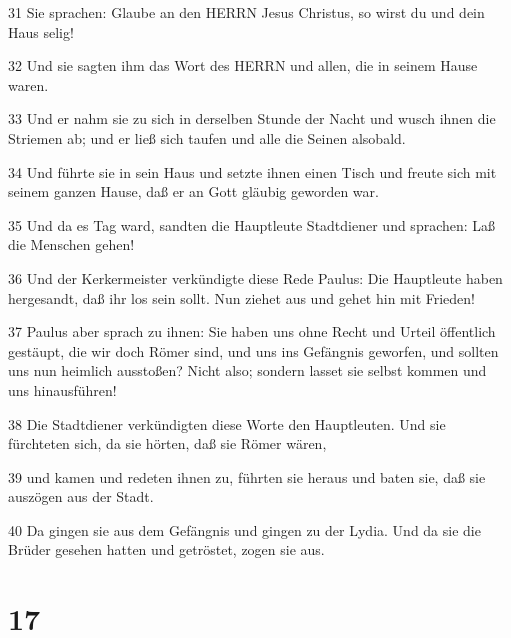 \par 31 Sie sprachen: Glaube an den HERRN Jesus Christus, so wirst du und dein Haus selig!
\par 32 Und sie sagten ihm das Wort des HERRN und allen, die in seinem Hause waren.
\par 33 Und er nahm sie zu sich in derselben Stunde der Nacht und wusch ihnen die Striemen ab; und er ließ sich taufen und alle die Seinen alsobald.
\par 34 Und führte sie in sein Haus und setzte ihnen einen Tisch und freute sich mit seinem ganzen Hause, daß er an Gott gläubig geworden war.
\par 35 Und da es Tag ward, sandten die Hauptleute Stadtdiener und sprachen: Laß die Menschen gehen!
\par 36 Und der Kerkermeister verkündigte diese Rede Paulus: Die Hauptleute haben hergesandt, daß ihr los sein sollt. Nun ziehet aus und gehet hin mit Frieden!
\par 37 Paulus aber sprach zu ihnen: Sie haben uns ohne Recht und Urteil öffentlich gestäupt, die wir doch Römer sind, und uns ins Gefängnis geworfen, und sollten uns nun heimlich ausstoßen? Nicht also; sondern lasset sie selbst kommen und uns hinausführen!
\par 38 Die Stadtdiener verkündigten diese Worte den Hauptleuten. Und sie fürchteten sich, da sie hörten, daß sie Römer wären,
\par 39 und kamen und redeten ihnen zu, führten sie heraus und baten sie, daß sie auszögen aus der Stadt.
\par 40 Da gingen sie aus dem Gefängnis und gingen zu der Lydia. Und da sie die Brüder gesehen hatten und getröstet, zogen sie aus.

\chapter{17}

